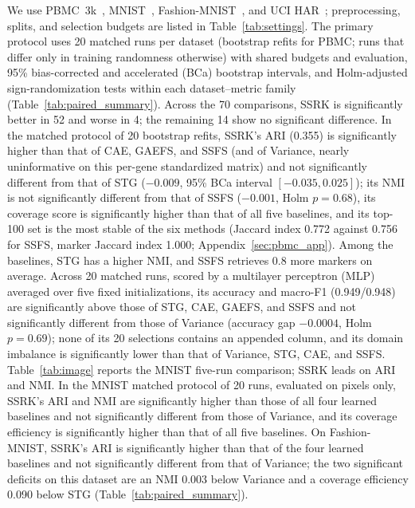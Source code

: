 We use PBMC~3k~\cite{zhengMassivelyParallelDigital2017,hatjeBescaPBMC3k2020}, MNIST~\cite{lecunGradientbasedLearningApplied1998}, Fashion-MNIST~\cite{xiaoFashionMNISTNovelImage2017}, and UCI HAR~\cite{anguitaPublicDomainDataset2013}; preprocessing, splits, and selection budgets are listed in Table~\ref{tab:settings}. The primary protocol uses 20 matched runs per dataset (bootstrap refits for PBMC; runs that differ only in training randomness otherwise) with shared budgets and evaluation, 95\% bias-corrected and accelerated (BCa) bootstrap intervals, and Holm-adjusted sign-randomization tests within each dataset--metric family (Table~\ref{tab:paired_summary}). Across the 70 comparisons, SSRK is significantly better in 52 and worse in 4; the remaining 14 show no significant difference.
In the matched protocol of 20 bootstrap refits, SSRK's ARI (0.355) is significantly higher than that of CAE, GAEFS, and SSFS (and of Variance, nearly uninformative on this per-gene standardized matrix) and not significantly different from that of STG ($-0.009$, 95\% BCa interval $[-0.035,0.025]$); its NMI is not significantly different from that of SSFS ($-0.001$, Holm $p=0.68$), its coverage score is significantly higher than that of all five baselines, and its top-100 set is the most stable of the six methods (Jaccard index 0.772 against 0.756 for SSFS, marker Jaccard index 1.000; Appendix~\ref{sec:pbmc_app}). Among the baselines, STG has a higher NMI, and SSFS retrieves 0.8 more markers on average.
Across 20 matched runs, scored by a multilayer perceptron (MLP) averaged over five fixed initializations, its accuracy and macro-F1 (0.949/0.948) are significantly above those of STG, CAE, GAEFS, and SSFS and not significantly different from those of Variance (accuracy gap $-0.0004$, Holm $p=0.69$); none of its 20 selections contains an appended column, and its domain imbalance is significantly lower than that of Variance, STG, CAE, and SSFS.
Table~\ref{tab:image} reports the MNIST five-run comparison; SSRK leads on ARI and NMI. In the MNIST matched protocol of 20 runs, evaluated on pixels only, SSRK's ARI and NMI are significantly higher than those of all four learned baselines and not significantly different from those of Variance, and its coverage efficiency is significantly higher than that of all five baselines. On Fashion-MNIST, SSRK's ARI is significantly higher than that of the four learned baselines and not significantly different from that of Variance; the two significant deficits on this dataset are an NMI 0.003 below Variance and a coverage efficiency 0.090 below STG (Table~\ref{tab:paired_summary}).
